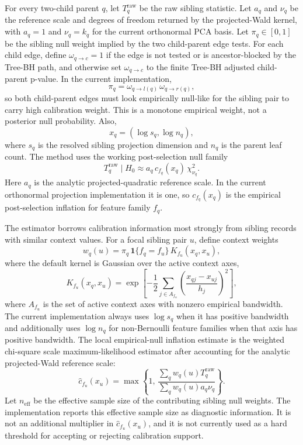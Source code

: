 For every two-child parent $q$, let $T_q^{\mathrm{raw}}$ be the raw sibling
statistic. Let $a_q$ and $\nu_q$ be the reference scale and degrees of freedom
returned by the projected-Wald kernel, with $a_q=1$ and $\nu_q=k_q$ for the
current orthonormal PCA basis. Let $\pi_q \in [0,1]$ be the sibling null weight
implied by the two child-parent edge tests. For each child edge, define
\(\omega_{q\to c}=1\) if the edge is not tested or is ancestor-blocked by the
Tree-BH path, and otherwise set \(\omega_{q\to c}\) to the finite Tree-BH
adjusted child-parent p-value. In the current implementation,
\begin{equation}
\pi_q =
\omega_{q\to l(q)}\,\omega_{q\to r(q)},
\end{equation}
so both child-parent edges must look empirically null-like for the sibling pair
to carry high calibration weight. This is a monotone empirical weight, not a
posterior null probability. Also,
\[
x_q = (\log s_q,\log n_q),
\]
where $s_q$ is the resolved sibling projection dimension and $n_q$ is the
parent leaf count. The method uses the working post-selection null family
\begin{equation}\label{eq:sibling-context-scale-model}
T_q^{\mathrm{raw}} \mid H_0
\approx
a_q\,c_{f_q}(x_q)\,\chi^2_{\nu_q}.
\end{equation}
Here $a_q$ is the analytic projected-quadratic reference scale. In the current
orthonormal projection implementation it is one, so $c_{f_q}(x_q)$ is the
empirical post-selection inflation for feature family $f_q$.

The estimator borrows calibration information most strongly from sibling
records with similar context values. For a focal sibling pair $u$, define
context weights
\begin{equation}
w_q(u)
=
\pi_q\,\mathbf 1\{f_q=f_u\}\,K_{f_u}(x_q,x_u),
\end{equation}
where the default kernel is Gaussian over the active context axes,
\begin{equation}
K_{f_u}(x_q,x_u)
=
\exp\!\left[
-\frac{1}{2}
\sum_{j\in A_{f_u}}
\left(
\frac{x_{qj}-x_{uj}}{h_j}
\right)^2
\right],
\end{equation}
where $A_{f_u}$ is the set of active context axes with nonzero empirical
bandwidth. The current implementation always uses \(\log s_q\) when it has
positive bandwidth and additionally uses \(\log n_q\) for non-Bernoulli
feature families when that axis has positive bandwidth. The local
empirical-null inflation estimate is the weighted
chi-square scale maximum-likelihood estimator after accounting for the analytic
projected-Wald reference scale:
\begin{equation}\label{eq:sibling-context-scale-estimator}
\hat{c}_{f_u}(x_u)
=
\max\left\{
1,\,
\frac{\sum_q w_q(u)T_q^{\mathrm{raw}}}
{\sum_q w_q(u)a_q\nu_q}
\right\}.
\end{equation}
Let $n_{\mathrm{eff}}$ be the effective sample size of the contributing sibling
null weights. The implementation reports this effective sample size as
diagnostic information. It is not an additional multiplier in
\(\hat c_{f_u}(x_u)\), and it is not currently used as a hard threshold for
accepting or rejecting calibration support.

